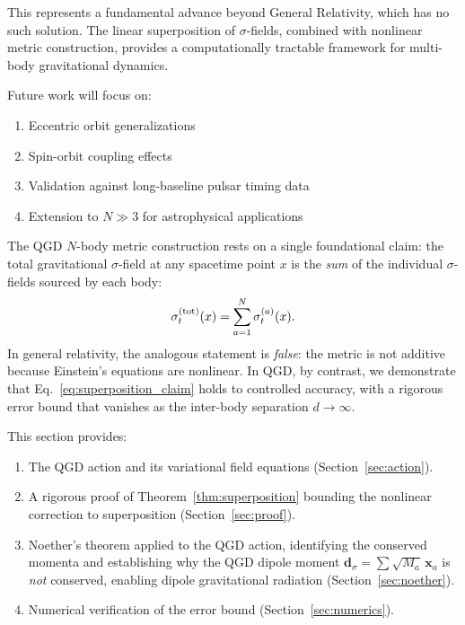 \documentclass[11pt,a4paper]{article}
\theoremstyle{definition}
\theoremstyle{remark}
\newcommand{\sig}[2]{\sigma_{#1}^{(#2)}}
\newcommand{\boldx}{\mathbf{x}}
\begin{document}
	This represents a fundamental advance beyond General Relativity, which has no such solution. The linear superposition of $\sigma$-fields, combined with nonlinear metric construction, provides a computationally tractable framework for multi-body gravitational dynamics.
	
	Future work will focus on:
	\begin{enumerate}
		\item Eccentric orbit generalizations
		\item Spin-orbit coupling effects
		\item Validation against long-baseline pulsar timing data
		\item Extension to $N \gg 3$ for astrophysical applications
	\end{enumerate}
	
	The QGD $N$-body metric construction rests on a single foundational
	claim: the total gravitational $\sigma$-field at any spacetime point
	$x$ is the \emph{sum} of the individual $\sigma$-fields sourced by
	each body:
	\begin{equation}
		\sigma_t^{(\rm tot)}(x)
		= \sum_{a=1}^{N} \sig{t}{a}(x).
		\label{eq:superposition_claim}
	\end{equation}
	In general relativity, the analogous statement is \emph{false}: the
	metric is not additive because Einstein's equations are nonlinear.
	In QGD, by contrast, we demonstrate that Eq.~\eqref{eq:superposition_claim}
	holds to controlled accuracy, with a rigorous error bound that vanishes
	as the inter-body separation $d\to\infty$.
	
	This section provides:
	\begin{enumerate}
		\item The QGD action and its variational field equations
		(Section~\ref{sec:action}).
		\item A rigorous proof of Theorem~\ref{thm:superposition} bounding
		the nonlinear correction to superposition
		(Section~\ref{sec:proof}).
		\item Noether's theorem applied to the QGD action, identifying the
		conserved momenta and establishing why the QGD dipole moment
		$\boldsymbol{d}_\sigma = \sum\sqrt{M_a}\,\boldx_a$ is \emph{not}
		conserved, enabling dipole gravitational radiation
		(Section~\ref{sec:noether}).
		\item Numerical verification of the error bound
		(Section~\ref{sec:numerics}).
	\end{enumerate}
	
\end{document}
